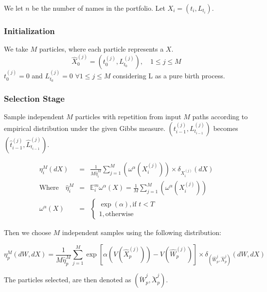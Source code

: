 We let $n$ be the number of names in the portfolio. Let $X_{i} = \left(t_{i},L_{t_{i}}\right)$.
\subsubsection{Initialization}
We take $M$ particles, where each particle represents a $X$.
\begin{equation*}
\hat{X}_0^{(j)} = \left( t_{0}^{(j)},L_{t_0}^{(j)} \right),  \quad  1 \leq j\leq M                                                                    
\end{equation*}
$ t_{0}^{(j)} = 0$ and $ L_{t_{0}}^{(j)} = 0$ $\forall 1 \leq j\leq M $ considering L as a pure birth process.


\subsubsection{Selection Stage}
Sample independent $M$ particles with repetition from input $M$ paths according to empirical distribution under the given Gibbs measure.
$\left(t^{(j)}_{i-1}, L_{t_{i-1}}^{(j)} \right)$ becomes $\left( \hat{t}_{i-1}^{(j)}, \hat{L}_{t_{i-1}}^{(j)}\right)$.

\begin{eqnarray*}
\eta_{i}^{M}(dX) & = & \frac{1}{M \hat{\eta}_{i}^{M}}\sum_{j=1}^{M}\left(\omega^{\alpha}(X_{i}^{(j)})\right) \times \delta_{{X}_i^{(j)}}(dX) \\
\text{Where} \quad
\hat{\eta}_{i}^{M} & = & \mathbb{E}_{i}^{m}\omega^{\alpha}(X) =
\frac{1}{M}\sum_{j=1}^{M}\left(\omega^{\alpha}(X_{i}^{(j)})\right)\\
\omega^{\alpha}(X) & = &  
\begin{cases}
\exp(\alpha), \text{if } t < T\\
1,               \text{otherwise}
\end{cases}
\end{eqnarray*}

Then we choose $M$ independent samples using the following distribution:

\begin{equation}
	\eta_{p}^{M} (dW,dX) = \frac{1}{M \hat{\eta}_{p}^{M}} \sum_{j=1}^{M} 
	\exp \left[ \alpha \left( V(\hat{X}_{p}^{(j)}) \right) - V(\hat{W}^{(j)}_{p}) 
	\right] \times \delta_{(\hat{W}_p^{j},\hat{X}_p^{j})} (dW,dX)
\end{equation}

The particles selected, are then denoted as $(\breve{W}_p^{j},\breve{X}_p^{j})$.

